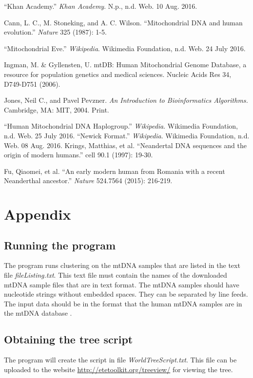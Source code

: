 \documentclass[conference]{IEEEtran}
\begin{document}
\FloatBarrier
\begin{thebibliography}{1}

\enquote{Khan Academy.} \textit{Khan Academy}. N.p., n.d. Web. 10 Aug. 2016.

Cann, L. C., M. Stoneking, and A. C. Wilson. \enquote{Mitochondrial DNA and human evolution.} \textit{Nature} 325 (1987): 1-5.

\enquote{Mitochondrial Eve.} \textit{Wikipedia}. Wikimedia Foundation, n.d. Web. 24 July 2016.

Ingman, M. \& Gyllensten, U. mtDB: Human Mitochondrial Genome Database, a resource for population genetics and medical sciences. Nucleic Acids Res 34, D749-D751 (2006).

Jones, Neil C., and Pavel Pevzner. \textit{An Introduction to Bioinformatics Algorithms.} Cambridge, MA: MIT, 2004. Print.

\enquote{Human Mitochondrial DNA Haplogroup.} \textit{Wikipedia}. Wikimedia Foundation, n.d. Web. 25 July 2016.
\enquote{Newick Format.} \textit{Wikipedia}. Wikimedia Foundation, n.d. Web. 08 Aug. 2016.
Krings, Matthias, et al. \enquote{Neandertal DNA sequences and the origin of modern humans.} cell 90.1 (1997): 19-30.

Fu, Qiaomei, et al. \enquote{An early modern human from Romania with a recent Neanderthal ancestor.} \textit{Nature} 524.7564 (2015): 216-219.
\end{thebibliography}

\section{Appendix}
\subsection{Running the program}
\label{sssec:num1} 

The program runs clustering on the mtDNA samples that are listed in the text file \textit{fileListing.txt}. This text file must contain the names of the downloaded mtDNA sample files that are in text format. The mtDNA samples should have nucleotide strings without embedded spaces. They can be separated by line feeds. The input data should be in the format that the human mtDNA samples are in the mtDNA database \cite{mtDnaDatabase}.

\subsection{Obtaining the tree script}
The program will create the script in file \textit{WorldTreeScript.txt}. This file can be uploaded to the website \url{http://etetoolkit.org/treeview/} for viewing the tree.
\end{document}
